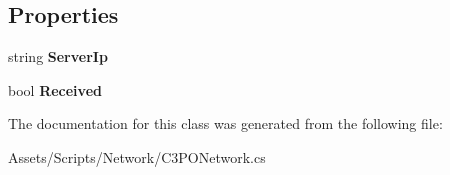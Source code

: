 \subsection*{Properties}
\begin{DoxyCompactItemize}
\item 
\hypertarget{class_c3_p_o_network_1_1_connection_manager_a7b8e8b02b043e233b9568daf2bd58372}{string {\bfseries Server\-Ip}}\label{class_c3_p_o_network_1_1_connection_manager_a7b8e8b02b043e233b9568daf2bd58372}

\item 
\hypertarget{class_c3_p_o_network_1_1_connection_manager_a3a65f1a035f491e2fe217fec7ba18b85}{bool {\bfseries Received}}\label{class_c3_p_o_network_1_1_connection_manager_a3a65f1a035f491e2fe217fec7ba18b85}

\end{DoxyCompactItemize}


The documentation for this class was generated from the following file\-:\begin{DoxyCompactItemize}
\item 
Assets/\-Scripts/\-Network/C3\-P\-O\-Network.\-cs\end{DoxyCompactItemize}
